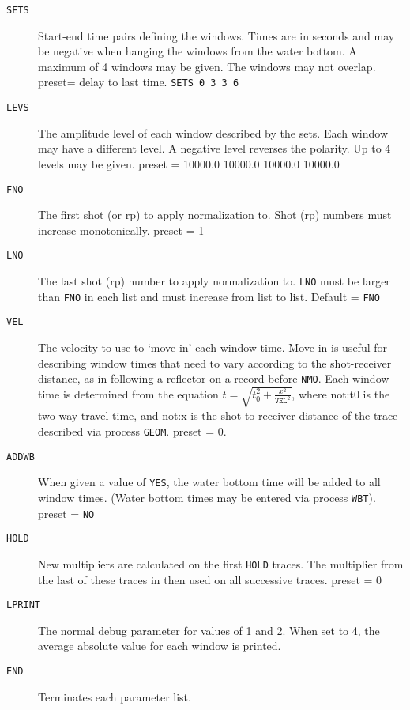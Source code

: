 \begin{description}
\item[\texttt{SETS}] Start-end time pairs defining the windows.  Times are in
    seconds and may be negative when hanging the windows from the water bottom.
    A maximum of 4 windows may be given.  The windows may not overlap.
    \Gls{preset}= delay to last time.   \texttt{SETS 0 3 3 6}

\item[\texttt{LEVS}] The amplitude level of each window described by the sets.
    Each window may have a different level.  A negative level reverses the
    polarity.   Up to 4 levels may be given.  \Gls{preset} = 10000.0 10000.0
    10000.0 10000.0

\item[\texttt{FNO}] The first \gls{shot} (or \gls{rp}) to apply normalization to.  Shot
    (\gls{rp}) numbers must increase monotonically.  \Gls{preset} = 1

\item[\texttt{LNO}] The last \gls{shot} (\gls{rp}) number to apply normalization to.
    \texttt{LNO} must be larger than \texttt{FNO} in each list and must
    increase from list to list.  Default = \texttt{FNO}

\item[\texttt{VEL}] The velocity to use to `move-in' each window time.  Move-in
    is useful for describing window times that need to vary according to the
    \gls{shot}-receiver distance, as in following a reflector on a record before
        \texttt{NMO}.  Each window time is determined from the equation
        $t = \sqrt{t_{0}^{2} + \frac{x^{2}}{\texttt{VEL}^{2}}}$, where \gls{not:t0}%
        is the two-way travel time, and \gls{not:x} %
        is the \gls{shot} to receiver distance of the trace described via
        process \texttt{GEOM}.  \Gls{preset} = 0.

\item[\texttt{ADDWB}] When given a value of \texttt{YES}, the water bottom time
    will be added to all window times.  (Water bottom times may be entered via
    process \texttt{WBT}).  \Gls{preset} = \texttt{NO}

\item[\texttt{HOLD}] New multipliers are calculated on the first \texttt{HOLD}
    traces.  The multiplier from the last of these traces in then used on all
    successive traces.  \Gls{preset} = 0

\item[\texttt{LPRINT}] The normal debug parameter for values of 1 and 2.  When
    set to 4, the average absolute value for each window is printed.

\item[\texttt{END}] Terminates each parameter list.
\end{description}

